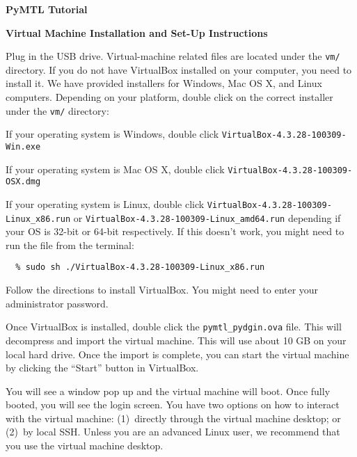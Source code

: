 \documentclass[11pt]{article}
\newenvironment{cbxlist}
{%
  \begin{list}{\textbullet}
  {%
    \setlength{\leftmargin}{1.5em}
    \setlength{\rightmargin}{0em}
    \setlength{\topsep}{0.05in}
    \setlength{\parsep}{0pt}
    \setlength{\listparindent}{0pt}
    \setlength{\itemsep}{0.5em}
  }
}{%
  \end{list}
}
\begin{document}
\pagestyle{empty}

\begin{center}

  {\LARGE\textbf{PyMTL Tutorial}}

  \vspace{0.05in}
  {\LARGE\textbf{Virtual Machine Installation and Set-Up Instructions}}

\end{center}

\vspace{0.1in}
Plug in the USB drive. Virtual-machine related files are located under the
\texttt{vm/} directory. If you do not have VirtualBox installed on your
computer, you need to install it. We have provided installers for Windows,
Mac OS X, and Linux computers. Depending on your platform, double click on
the correct installer under the \texttt{vm/} directory:

\begin{cbxlist}

  \item If your operating system is Windows, double click
  \texttt{VirtualBox-4.3.28-100309-Win.exe}
  \item If your operating system is Mac OS X, double click
  \texttt{VirtualBox-4.3.28-100309-OSX.dmg}
  \item If your operating system is Linux, double click
    \texttt{VirtualBox-4.3.28-100309-Linux\_x86.run} or
    \texttt{VirtualBox-4.3.28-100309-Linux\_amd64.run} depending if your OS is
    32-bit or 64-bit respectively. If this doesn't work, you might need to
    run the file from the terminal:

    \begin{verbatim}
  % sudo sh ./VirtualBox-4.3.28-100309-Linux_x86.run
    \end{verbatim}

\end{cbxlist}
\vspace{-0.15in}

Follow the directions to install VirtualBox. You might need to enter your
administrator password.

Once VirtualBox is installed, double click the \texttt{pymtl\_pydgin.ova}
file. This will decompress and import the virtual machine. This will use
about 10 GB on your local hard drive. Once the import is complete, you
can start the virtual machine by clicking the ``Start'' button in
VirtualBox.

You will see a window pop up and the virtual machine will boot. Once
fully booted, you will see the login screen. You have two options on how
to interact with the virtual machine: (1)~directly through the virtual
machine desktop; or (2)~by local SSH. Unless you are an advanced Linux
user, we recommend that you use the virtual machine desktop.
\end{document}
